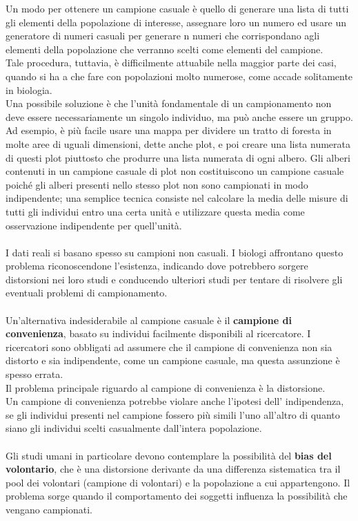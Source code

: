 \documentclass[drafts, 10pt]{book}
\begin{document}
Un modo per ottenere un campione casuale è quello di generare una lista di tutti gli elementi della popolazione di interesse, assegnare loro un numero ed usare un generatore di numeri casuali per generare n numeri che corrispondano agli elementi della popolazione che verranno scelti come elementi del campione.
\\
Tale procedura, tuttavia, è difficilmente attuabile nella maggior parte dei casi, quando si ha a che fare con popolazioni molto numerose, come accade solitamente in biologia.
\\
Una possibile soluzione è che l'unità fondamentale di un campionamento non deve essere necessariamente un singolo individuo, ma può anche essere un gruppo.
\\
Ad esempio, è più facile usare una mappa per dividere un tratto di foresta in molte aree di uguali dimensioni, dette anche plot, e poi creare una lista numerata di questi plot piuttosto che produrre una lista numerata di ogni albero. Gli alberi contenuti in un campione casuale di plot non costituiscono un campione casuale poiché gli alberi presenti nello stesso plot non sono campionati in modo indipendente; una semplice tecnica consiste nel calcolare la media delle misure di tutti gli individui entro una certa unità e utilizzare questa media come osservazione indipendente per quell'unità.
\\
\\
I dati reali si basano spesso su campioni non casuali. I biologi affrontano questo problema riconoscendone l'esistenza, indicando dove potrebbero sorgere distorsioni nei loro studi e conducendo ulteriori studi per tentare di risolvere gli eventuali problemi di campionamento.
\\
\\
Un'alternativa indesiderabile al campione casuale è il \textbf{campione di convenienza}, basato su individui facilmente disponibili al ricercatore. I ricercatori sono obbligati ad assumere che il campione di convenienza non sia distorto e sia indipendente, come un campione casuale, ma questa assunzione è spesso errata.
\\
Il problema principale riguardo al campione di convenienza è la distorsione.
\\
Un campione di convenienza potrebbe violare anche l'ipotesi dell' indipendenza, se gli individui presenti nel campione fossero più simili l'uno all'altro di quanto siano gli individui scelti casualmente dall'intera popolazione.
\\
\\
Gli studi umani in particolare devono contemplare la possibilità del \textbf{bias del volontario}, che è una distorsione derivante da una differenza sistematica tra il pool dei volontari (campione di volontari) e la popolazione a cui appartengono. Il problema sorge quando il comportamento dei soggetti influenza la possibilità che vengano campionati.
\end{document}
